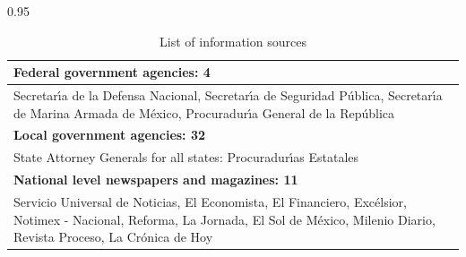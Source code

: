 \documentclass[12pt,letterpaper]{article}
\begin{document}
\begin{table}[h!]
\small
    \caption{List of information sources}
    \label{tab:ocved_info_sources}
\begin{spacing}{0.95}
    \centering
    \begin{tabular}{|ll|}
    \hline
    
\multicolumn{2}{|l|}{\textbf{Federal government agencies: 4  }}     \\
\hline
\multicolumn{2}{|p{15cm}|}{ Secretar\'{\i}a de la Defensa Nacional,  Secretar\'{\i}a de Seguridad P\'{u}blica,  Secretar\'{\i}a de Marina Armada de M\'{e}xico, Procuradur\'{\i}a General de la Rep\'{u}blica}  \\
        \hline
        
\multicolumn{2}{|l|}{\textbf{Local government agencies: 32  }}     \\
\hline
\multicolumn{2}{|p{15cm}|}{State Attorney Generals for all states: Procuradur\'{\i}as Estatales}   \\
\hline

\multicolumn{2}{|l|}{\textbf{National level newspapers and magazines: 11}}     \\
\hline
\multicolumn{2}{|p{15cm}|}{Servicio Universal de Noticias, El Economista, El Financiero, Exc\'{e}lsior,  Notimex - Nacional, Reforma, La Jornada, El Sol de M\'{e}xico, Milenio Diario, Revista Proceso, La Cr\'{o}nica de Hoy }  \\
\hline


\end{tabular}
\end{spacing}
\end{table}
\end{document}
